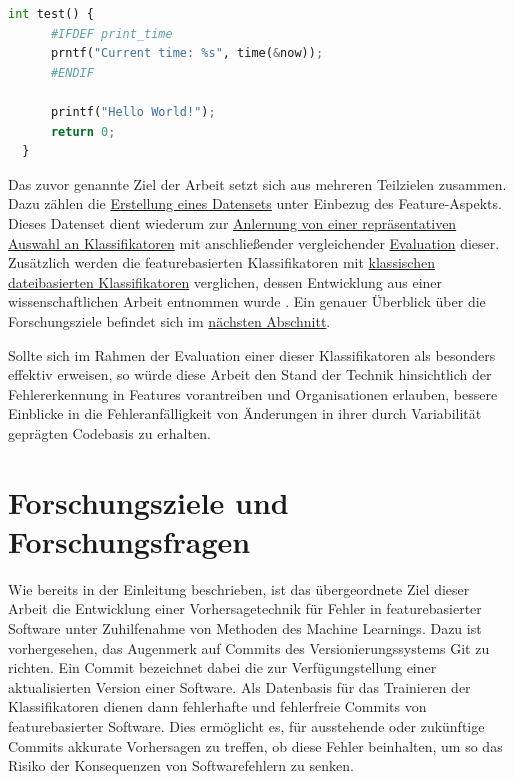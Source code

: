 \begin{lstlisting}[language=Python, caption=Exemplarische Darstellung eines fehlerhaften Features, frame=single, label=bug-code]
int test() {
	  #IFDEF print_time
	  prntf("Current time: %s", time(&now));
	  #ENDIF

	  printf("Hello World!");
	  return 0;
  }
\end{lstlisting}
 
Das zuvor genannte Ziel der Arbeit setzt sich aus mehreren Teilzielen zusammen. Dazu zählen die \hyperref[dataset]{Erstellung eines Datensets} unter Einbezug des Feature-Aspekts. Dieses Datenset dient wiederum zur \hyperref[training]{Anlernung von einer repräsentativen Auswahl an Klassifikatoren} mit anschließender vergleichender \hyperref[evaluation]{Evaluation} dieser. Zusätzlich werden die featurebasierten Klassifikatoren mit \hyperref[classic-eval]{klassischen dateibasierten Klassifikatoren} verglichen, dessen Entwicklung aus einer wissenschaftlichen Arbeit entnommen wurde \cite{Moser2008}. Ein genauer Überblick über die Forschungsziele befindet sich im \hyperref[research_objectives]{nächsten Abschnitt}.

Sollte sich im Rahmen der Evaluation einer dieser Klassifikatoren als besonders effektiv erweisen, so würde diese Arbeit den Stand der Technik hinsichtlich der Fehlererkennung in Features vorantreiben und Organisationen erlauben, bessere Einblicke in die Fehleranfälligkeit von Änderungen in ihrer durch Variabilität geprägten Codebasis zu erhalten.

\section{Forschungsziele und Forschungsfragen}

Wie bereits in der Einleitung beschrieben, ist das übergeordnete Ziel dieser Arbeit die Entwicklung einer Vorhersagetechnik für Fehler in featurebasierter Software unter Zuhilfenahme von Methoden des Machine Learnings. Dazu ist vorhergesehen, das Augenmerk auf Commits des Versionierungssystems Git zu richten. Ein Commit bezeichnet dabei die zur Verfügungstellung einer aktualisierten Version einer Software. Als Datenbasis für das Trainieren der Klassifikatoren dienen dann fehlerhafte und fehlerfreie Commits von featurebasierter Software. Dies ermöglicht es, für ausstehende oder zukünftige Commits akkurate Vorhersagen zu treffen, ob diese Fehler beinhalten, um so das Risiko der Konsequenzen von Softwarefehlern zu senken.

